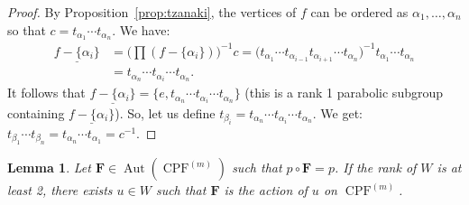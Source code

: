 \documentclass[11pt]{article}
\newtheorem{lemm}[theo]{Lemma}
\theoremstyle{definition}
\DeclareMathOperator{\Aut}{Aut}
\newcommand{\FFF}{\mathbf{F}}
\DeclareMathOperator{\CPF}{CPF}
\begin{document}
\begin{proof}
    By Proposition~\ref{prop:tzanaki}, the vertices of $f$ can be ordered as $\alpha_1,\dots,\alpha_n$ so that $c = t_{\alpha_1} \cdots t_{\alpha_n}$.  We have:
    \begin{align*}
        \underline{f-\{\alpha_i\}}
        &=
        \big(\textstyle\prod (f-\{\alpha_i\}) \big)^{-1} c 
        =
        \big(t_{\alpha_1} \cdots t_{\alpha_{i-1}} t_{\alpha_{i+1}} \cdots t_{\alpha_n} \big)^{-1} t_{\alpha_1} \cdots t_{\alpha_n} \\
        &= t_{\alpha_n} \cdots t_{\alpha_{i}} \cdots 
        t_{\alpha_n}.
    \end{align*}
    It follows that $\underline{f-\{\alpha_i\}} = \{e, t_{\alpha_n} \cdots t_{\alpha_{i}} \cdots t_{\alpha_n}\}$ (this is a rank 1 parabolic subgroup containing $\underline{f-\{\alpha_i\}}$). So, let us define $t_{\beta_i} = t_{\alpha_n} \cdots t_{\alpha_{i}} \cdots t_{\alpha_n} $.  We get: $t_{\beta_1} \cdots t_{\beta_n} = t_{\alpha_n} \cdots t_{\alpha_1} = c^{-1}$.
\end{proof}

\begin{lemm}
    Let $\FFF \in \Aut(\CPF^{(m)})$ such that $p\circ\FFF = p$.  If the rank of $W$ is at least 2, there exists $u \in W$ such that $\FFF$ is the action of $u$ on $\CPF^{(m)}$.
\end{lemm}
\end{document}
